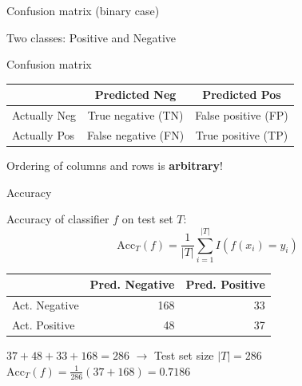 \documentclass[12pt,aspectratio=169,handout]{beamer}
\begin{document}
\begin{frame}{Confusion matrix (binary case)}

Two classes: Positive and Negative

\begin{block}{Confusion matrix}
\begin{tabular}{l|cc}
& Predicted Neg & Predicted Pos \\ \toprule
Actually Neg & True negative (TN) & False positive (FP) \\
Actually Pos & False negative (FN) & True positive (TP) \\
\end{tabular}
\end{block}

\bigskip


Ordering of columns and rows is \textbf{arbitrary}!

\end{frame}


\begin{frame}{Accuracy}

Accuracy of classifier $f$ on test set $T$:
$$
\mathrm{Acc}_T(f) = \frac{1}{|T|} \sum_{i = 1}^{|T|} I (f(x_i) = y_i)
$$
	
\begin{example}
	\begin{tabular}{l|rr}
		& Pred. Negative & Pred. Positive \\ \toprule
		Act. Negative & 168 & 33 \\
		Act. Positive & 48 & 37 \\
	\end{tabular}
\end{example}

$37 + 48 + 33 + 168 = 286$ $\to$ Test set size $|T| = 286$
$\mathrm{Acc}_T(f) = \frac{1}{286} (37 + 168) = 0.7186$

	
\end{frame}
\end{document}
